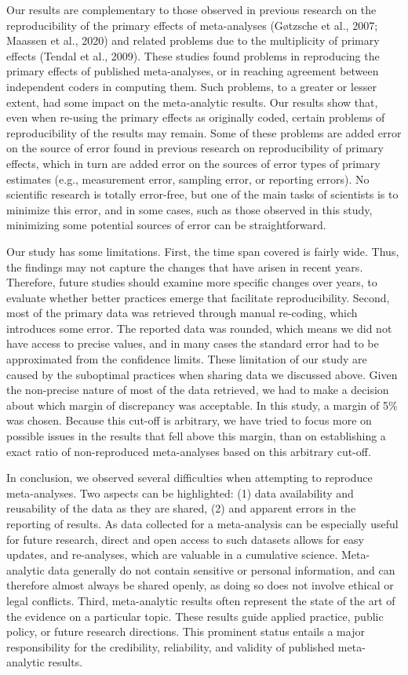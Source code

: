 \documentclass[
  ,apa7,floatsintext]{apa6}
\begin{document}
Our results are complementary to those observed in previous research on the reproducibility of the primary effects of meta-analyses (Gøtzsche et al., 2007; Maassen et al., 2020) and related problems due to the multiplicity of primary effects (Tendal et al., 2009). These studies found problems in reproducing the primary effects of published meta-analyses, or in reaching agreement between independent coders in computing them. Such problems, to a greater or lesser extent, had some impact on the meta-analytic results. Our results show that, even when re-using the primary effects as originally coded, certain problems of reproducibility of the results may remain. Some of these problems are added error on the source of error found in previous research on reproducibility of primary effects, which in turn are added error on the sources of error types of primary estimates (e.g., measurement error, sampling error, or reporting errors). No scientific research is totally error-free, but one of the main tasks of scientists is to minimize this error, and in some cases, such as those observed in this study, minimizing some potential sources of error can be straightforward.

Our study has some limitations. First, the time span covered is fairly wide. Thus, the findings may not capture the changes that have arisen in recent years. Therefore, future studies should examine more specific changes over years, to evaluate whether better practices emerge that facilitate reproducibility. Second, most of the primary data was retrieved through manual re-coding, which introduces some error. The reported data was rounded, which means we did not have access to precise values, and in many cases the standard error had to be approximated from the confidence limits. These limitation of our study are caused by the suboptimal practices when sharing data we discussed above. Given the non-precise nature of most of the data retrieved, we had to make a decision about which margin of discrepancy was acceptable. In this study, a margin of 5\% was chosen. Because this cut-off is arbitrary, we have tried to focus more on possible issues in the results that fell above this margin, than on establishing a exact ratio of non-reproduced meta-analyses based on this arbitrary cut-off.

In conclusion, we observed several difficulties when attempting to reproduce meta-analyses. Two aspects can be highlighted: (1) data availability and reusability of the data as they are shared, (2) and apparent errors in the reporting of results. As data collected for a meta-analysis can be especially useful for future research, direct and open access to such datasets allows for easy updates, and re-analyses, which are valuable in a cumulative science. Meta-analytic data generally do not contain sensitive or personal information, and can therefore almost always be shared openly, as doing so does not involve ethical or legal conflicts. Third, meta-analytic results often represent the state of the art of the evidence on a particular topic. These results guide applied practice, public policy, or future research directions. This prominent status entails a major responsibility for the credibility, reliability, and validity of published meta-analytic results.
\end{document}

